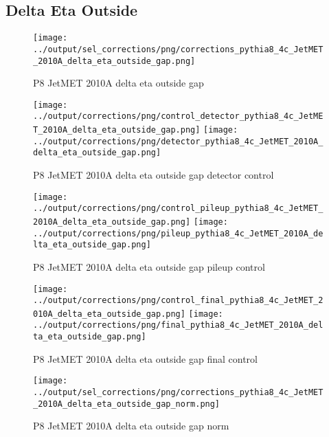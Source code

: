 \documentclass[11pt]{book}
\begin{document}
\clearpage
\subsection{Delta Eta Outside}
\begin{figure}[ht]
\centering
\texttt{[image: ../output/sel\_corrections/png/corrections\_pythia8\_4c\_JetMET\_2010A\_delta\_eta\_outside\_gap.png]}
\caption{P8 JetMET 2010A delta eta outside gap}
\label{fig:p8_JetMET_2010A_delta_eta_outside_gap}
\end{figure}

\begin{figure}[ht]
\centering
\texttt{[image: ../output/corrections/png/control\_detector\_pythia8\_4c\_JetMET\_2010A\_delta\_eta\_outside\_gap.png]}
\texttt{[image: ../output/corrections/png/detector\_pythia8\_4c\_JetMET\_2010A\_delta\_eta\_outside\_gap.png]}
\caption{P8 JetMET 2010A delta eta outside gap detector control}
\label{fig:p8_JetMET_2010A_delta_eta_outside_gap_detector_control}
\end{figure}

\begin{figure}[ht]
\centering
\texttt{[image: ../output/corrections/png/control\_pileup\_pythia8\_4c\_JetMET\_2010A\_delta\_eta\_outside\_gap.png]}
\texttt{[image: ../output/corrections/png/pileup\_pythia8\_4c\_JetMET\_2010A\_delta\_eta\_outside\_gap.png]}
\caption{P8 JetMET 2010A delta eta outside gap pileup control}
\label{fig:p8_JetMET_2010A_delta_eta_outside_gap_pileup_control}
\end{figure}


\begin{figure}[ht]
\centering
\texttt{[image: ../output/corrections/png/control\_final\_pythia8\_4c\_JetMET\_2010A\_delta\_eta\_outside\_gap.png]}
\texttt{[image: ../output/corrections/png/final\_pythia8\_4c\_JetMET\_2010A\_delta\_eta\_outside\_gap.png]}
\caption{P8 JetMET 2010A delta eta outside gap final control}
\label{fig:p8_JetMET_2010A_delta_eta_outside_gap_final_control}
\end{figure}



\begin{figure}[ht]
\centering
\texttt{[image: ../output/sel\_corrections/png/corrections\_pythia8\_4c\_JetMET\_2010A\_delta\_eta\_outside\_gap\_norm.png]}
\caption{P8 JetMET 2010A delta eta outside gap norm}
\label{fig:p8_JetMET_2010A_delta_eta_outside_gap_norm}
\end{figure}
\end{document}
